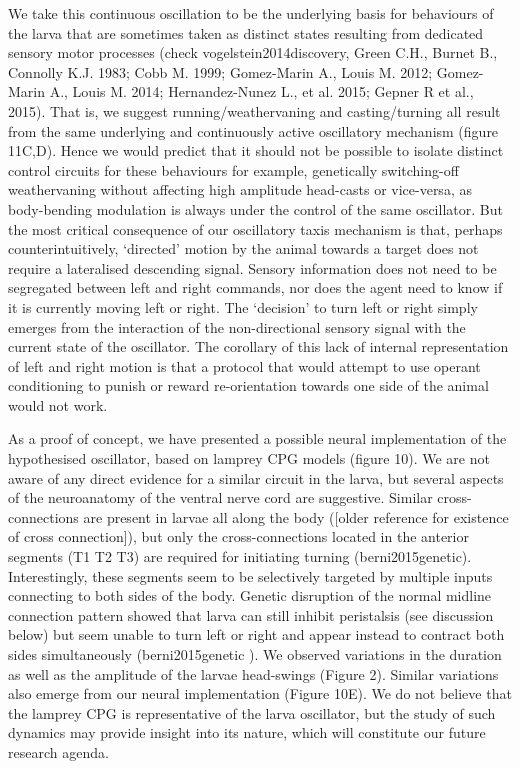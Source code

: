 \documentclass[10pt,a4paper]{article}
\begin{document}
We take this continuous oscillation to be the underlying basis for behaviours of the larva that are sometimes taken as distinct states resulting from dedicated sensory motor processes (check vogelstein2014discovery, Green C.H., Burnet B., Connolly K.J. 1983; Cobb M. 1999; Gomez-Marin A., Louis M. 2012; Gomez-Marin A., Louis M. 2014; Hernandez-Nunez L., et al. 2015; Gepner R et al., 2015). That is, we suggest running/weathervaning and casting/turning all result from the same underlying and continuously active oscillatory mechanism (figure 11C,D). Hence we would predict that it should not be possible to isolate distinct control circuits for these behaviours for example, genetically switching-off weathervaning without affecting high amplitude head-casts or vice-versa, as body-bending modulation is always under the control of the same oscillator. But the most critical consequence of our oscillatory taxis mechanism is that, perhaps counterintuitively, ‘directed’ motion by the animal towards a target does not require a lateralised descending signal. Sensory information does not need to be segregated between left and right commands, nor does the agent need to know if it is currently moving left or right. The ‘decision’ to turn left or right simply emerges from the interaction of the non-directional sensory signal with the current state of the oscillator. 
The corollary of this lack of internal representation of left and right motion is that a protocol that would attempt to use operant conditioning to punish or reward re-orientation towards one side of the animal would not work.

As a proof of concept, we have presented a possible neural implementation of the hypothesised oscillator, based on lamprey CPG models (figure 10). We are not aware of any direct evidence for a similar circuit in the larva, but several aspects of the neuroanatomy of the ventral nerve cord are suggestive. Similar cross-connections are present in larvae all along the body ([older reference for existence of cross connection]), but only the cross-connections located in the anterior segments (T1 T2 T3) are required for initiating turning (berni2015genetic). Interestingly, these segments seem to be selectively targeted by multiple inputs connecting to both sides of the body. Genetic disruption of the normal midline connection pattern showed that larva can still inhibit peristalsis (see discussion below) but seem unable to turn left or right and appear instead to contract both sides simultaneously (berni2015genetic ). We observed variations in the duration as well as the amplitude of the larvae head-swings (Figure 2). Similar variations also emerge from our neural implementation (Figure 10E). We do not believe that the lamprey CPG is representative of the larva oscillator, but the study of such dynamics may provide insight into its nature, which will constitute our future research agenda.
\end{document}
